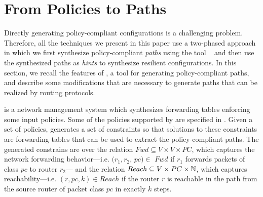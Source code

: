 \section{From Policies to Paths} \label{sec:genesis}
Directly generating policy-compliant configurations is a challenging
problem.
Therefore, all the techniques we present in this paper 
use a two-phased approach in which we first synthesize
policy-compliant \emph{paths} using the tool \genesis~\cite{genesis}
and then use the synthesized paths as \emph{hints} to synthesize resilient configurations. 
In this section, we recall the features of \genesis,
 a tool for generating policy-compliant paths, and describe
some modifications that are necessary to generate paths that
can be realized by routing protocols. 


\genesis is a network management
system which synthesizes forwarding tables enforcing some input policies. 
Some of the policies supported by \genesis are specified in 
. 
Given a set of policies, \genesis generates a set of constraints 
so that solutions to these constraints are forwarding
tables that can be used to extract the 
policy-compliant paths.
The generated constrains are over the relation $Fwd \subseteq V \times V \times PC$,
which captures
the network forwarding behavior---i.e. 
$(r_1, r_2$, $pc)\in$ $Fwd$ if 
$r_1$ forwards packets of class $pc$ to router $r_2$---
and 
the relation $Reach \subseteq V \times PC \times \mathbb{N}$,
which captures
reachability---i.e. $(r, pc, k)\in Reach$ if 
the router $r$ is reachable in the path from the source
router of packet class $pc$ in exactly $k$ steps.

